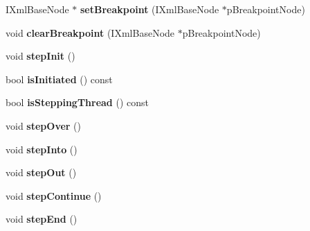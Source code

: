 \begin{DoxyCompactItemize}
\item 
\hypertarget{classgeneral__server_1_1User_ab7082563f53a8033c4033bad290a68c1}{\-I\-Xml\-Base\-Node $\ast$ {\bfseries set\-Breakpoint} (\-I\-Xml\-Base\-Node $\ast$p\-Breakpoint\-Node)}\label{classgeneral__server_1_1User_ab7082563f53a8033c4033bad290a68c1}

\item 
\hypertarget{classgeneral__server_1_1User_a90719b6dcbe313ffba04454caff8f295}{void {\bfseries clear\-Breakpoint} (\-I\-Xml\-Base\-Node $\ast$p\-Breakpoint\-Node)}\label{classgeneral__server_1_1User_a90719b6dcbe313ffba04454caff8f295}

\item 
\hypertarget{classgeneral__server_1_1User_a65bbf88226674f82e4ae08d6c9fde1b2}{void {\bfseries step\-Init} ()}\label{classgeneral__server_1_1User_a65bbf88226674f82e4ae08d6c9fde1b2}

\item 
\hypertarget{classgeneral__server_1_1User_a1ed68f0d8c6cf403f91395d0af90d0e4}{bool {\bfseries is\-Initiated} () const }\label{classgeneral__server_1_1User_a1ed68f0d8c6cf403f91395d0af90d0e4}

\item 
\hypertarget{classgeneral__server_1_1User_a8add4f85c903afd5d088060848bccdd4}{bool {\bfseries is\-Stepping\-Thread} () const }\label{classgeneral__server_1_1User_a8add4f85c903afd5d088060848bccdd4}

\item 
\hypertarget{classgeneral__server_1_1User_ab73dc020488700230b98d211582571d3}{void {\bfseries step\-Over} ()}\label{classgeneral__server_1_1User_ab73dc020488700230b98d211582571d3}

\item 
\hypertarget{classgeneral__server_1_1User_ac9c52aeececa206a1d868215b952d406}{void {\bfseries step\-Into} ()}\label{classgeneral__server_1_1User_ac9c52aeececa206a1d868215b952d406}

\item 
\hypertarget{classgeneral__server_1_1User_af53b8a25db6adad071b35efbf5d27ca7}{void {\bfseries step\-Out} ()}\label{classgeneral__server_1_1User_af53b8a25db6adad071b35efbf5d27ca7}

\item 
\hypertarget{classgeneral__server_1_1User_a38b1782d78cbf4af186ff2cb96eed220}{void {\bfseries step\-Continue} ()}\label{classgeneral__server_1_1User_a38b1782d78cbf4af186ff2cb96eed220}

\item 
\hypertarget{classgeneral__server_1_1User_a490e0efe1a60f900d1fab95993adc5fe}{void {\bfseries step\-End} ()}\label{classgeneral__server_1_1User_a490e0efe1a60f900d1fab95993adc5fe}


\end{DoxyCompactItemize}

